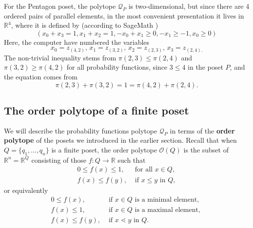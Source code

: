 \documentclass[11pt,a4paper,abstract=yes]{scrartcl}
\theoremstyle{plain}
\newcommand{\RR}{\mathbb{R}}
\newcommand{\prpolytope}[1]{\mathcal{Q}_{#1}}
\newcommand{\orderpolytope}[1]{\mathcal{O}({#1})}
\begin{document}
\begin{mexample}
\begin{center}
\begin{tabular}{c|c|c|c|c}
 \\
\end{tabular}\end{center}



For the Pentagon poset, the polytope \(\prpolytope{P}\) is two-dimensional, but since there are 4 ordered pairs
of parallel elements, in the most convenient presentation it  lives in \(\RR^{4}\), where it
is defined by (according to SageMath \autocite{sagemath})
\begin{displaymath}
\left(x_{0} + x_{3} = 1, x_{1} + x_{2} = 1, -x_{0} + x_{1} \geq 0, -x_{1} \geq -1, x_{0} \geq 0\right)
\end{displaymath}
Here, the computer have numbered the variables
\[x_{0}= z_{(4,2)}, \, x_{1}= z_{(3,2)}, \, x_{2} = z_{(2,3)}, \, x_{3}= z_{(2,4).}\]
The non-trivial inequality stems from \(\pi(2,3) \le \pi(2,4)\) and \(\pi(3,2) \ge \pi(4,2)\)
for all probability functions, since \(3 \le 4\) in the poset \(P\),
and the equation comes from \[\pi(2,3)+\pi(3,2)=1=\pi(4,2)+\pi(2,4).\]
\end{mexample}
\subsection{The order polytope of a finite poset}
\label{sec:org18135af}
We will describe the probability functions polytope \(\prpolytope{P}\) in terms of the \textbf{order polytope}
of the posets we introduced in the earlier section. Recall
\autocites{StanleyTwoPosetPolytopes}[][]{AhmadOrderChain}[][]{HibiUnimodularOrderpolytopes}[][]{HibiEdgesOrderpolytope}[][]{vonBellTriangulationsOrderpolytopes}
that when \(Q=\{q_{1},\dots,q_{n}\}\) is a finite poset,
the order polytope \(\orderpolytope{Q}\) is the subset of \(\RR^{n} = \RR^{Q}\) consisting of
those \(f: Q \to \RR\) such that
\begin{align}
\label{eq:order-polytope1}
  0 \le f(x) \le 1, & \text{ for all } x \in Q, \\
  f(x) \le f(y), & \text{ if } x \le y \text{ in } Q,
\end{align}
or equivalently
\begin{align}
\label{eq:order-polytope2}
  0 \le f(x), & \text{ if } x \in Q \text{ is a minimal element, } \\
  f(x) \le 1, & \text{ if } x \in Q \text{ is a maximal element, } \\
  f(x) \le f(y), & \text{ if } x \lessdot y \text{ in } Q.
\end{align}
\end{document}
